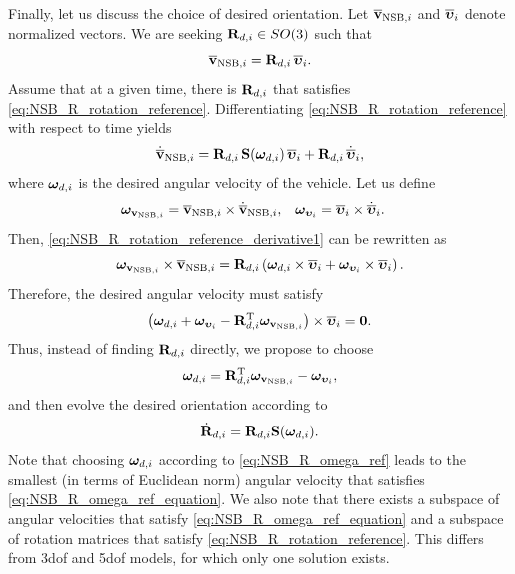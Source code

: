Finally, let us discuss the choice of desired orientation.
Let $\overline{\mathbf{v}}_{{\rm NSB}, i}$ and $\overline{\bm{\upsilon}}_{i}$ denote normalized vectors.
We are seeking $\mathbf{R}_{d, i} \in SO(3)$ such that 
\begin{equation}
    \overline{\mathbf{v}}_{{\rm NSB}, i} = \mathbf{R}_{d, i}\,\overline{\bm{\upsilon}}_{i}.
    \label{eq:NSB_R_rotation_reference}
\end{equation}
Assume that at a given time, there is $\mathbf{R}_{d, i}$ that satisfies \eqref{eq:NSB_R_rotation_reference}.
Differentiating \eqref{eq:NSB_R_rotation_reference} with respect to time yields 
\begin{equation}
    \dot{\overline{\mathbf{v}}}_{{\rm NSB}, i} = \mathbf{R}_{d, i}\,\mathbf{S}(\bm{\omega}_{d, i})\,\overline{\bm{\upsilon}}_{i} + \mathbf{R}_{d, i}\,\dot{\overline{\bm{\upsilon}}}_{i},
    \label{eq:NSB_R_rotation_reference_derivative1}
\end{equation}
where $\bm{\omega}_{d, i}$ is the desired angular velocity of the vehicle.     
Let us define
\begin{align}
    \bm{\omega}_{\mathbf{v}_{{\rm NSB}, i}} &= \overline{\mathbf{v}}_{{\rm NSB}, i} \times \dot{\overline{\mathbf{v}}}_{{\rm NSB}, i}, &
    \bm{\omega}_{\bm{\upsilon}_{i}} &= \overline{\bm{\upsilon}}_{i} \times \dot{\overline{\bm{\upsilon}}}_{i}.
    \label{eq:NSB_R_omega_v}
\end{align}    
Then, \eqref{eq:NSB_R_rotation_reference_derivative1} can be rewritten as 
\begin{equation}
    \bm{\omega}_{\mathbf{v}_{{\rm NSB}, i}} \times \overline{\mathbf{v}}_{{\rm NSB}, i} = 
    \mathbf{R}_{d, i} \left( \bm{\omega}_{d, i} \times \overline{\bm{\upsilon}}_{i} + \bm{\omega}_{\bm{\upsilon}_{i}} \times \overline{\bm{\upsilon}}_{i} \right).
\end{equation}
Therefore, the desired angular velocity must satisfy 
\begin{equation}
    \left( \bm{\omega}_{d, i} + \bm{\omega}_{\bm{\upsilon}_{i}} 
    - \mathbf{R}_{d, i}^{\mathrm{T}} \bm{\omega}_{\mathbf{v}_{{\rm NSB}, i}} \right) \times \overline{\bm{\upsilon}}_{i} = \mathbf{0}. \label{eq:NSB_R_omega_ref_equation}
\end{equation}
Thus, instead of finding $\mathbf{R}_{d, i}$ directly, we propose to choose 
\begin{equation}
    \bm{\omega}_{d, i} = \mathbf{R}_{d, i}^{\mathrm{T}} \bm{\omega}_{\mathbf{v}_{{\rm NSB}, i}} - \bm{\omega}_{\bm{\upsilon}_{i}},
    \label{eq:NSB_R_omega_ref}
\end{equation}
and then evolve the desired orientation according to 
\begin{equation}
    \dot{\mathbf{R}}_{d, i} = \mathbf{R}_{d, i} \mathbf{S}(\bm{\omega}_{d, i}).
\end{equation}
Note that choosing $\bm{\omega}_{d, i}$ according to \eqref{eq:NSB_R_omega_ref} leads to the smallest (in terms of Euclidean norm) angular velocity that satisfies \eqref{eq:NSB_R_omega_ref_equation}.
We also note that there exists a subspace of angular velocities that satisfy \eqref{eq:NSB_R_omega_ref_equation} and a subspace of rotation matrices that satisfy \eqref{eq:NSB_R_rotation_reference}.
This differs from 3\gls{dof} \cite{eek_formation_2021,arrichiello_formation_2006} and 5\gls{dof} \cite{matouvs_formation_2022} models, for which only one solution exists.


